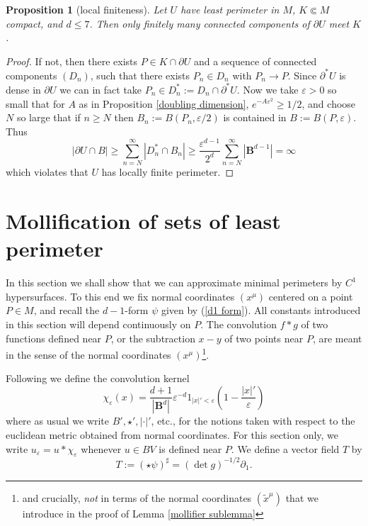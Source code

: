 \documentclass[reqno,12pt,letterpaper]{amsart}
\newcommand{\Ball}{\mathbf{B}}
\newtheorem{proposition}[theorem]{Proposition}
\theoremstyle{definition}
\numberwithin{equation}{section}
\begin{document}
\begin{proposition}[local finiteness]\label{local finiteness}
Let $U$ have least perimeter in $M$, $K \Subset M$ compact, and $d \leq 7$. Then only finitely many connected components of $\partial U$ meet $K$.
\end{proposition}
\begin{proof}
If not, then there exists $P \in K \cap \partial U$ and a sequence of connected components $(D_n)$, such that there exists $P_n \in D_n$ with $P_n \to P$.
Since $\partial^* U$ is dense in $\partial U$ we can in fact take $P_n \in D_n^* := D_n \cap \partial^* U$.
Now we take $\varepsilon > 0$ so small that for $A$ as in Proposition \ref{doubling dimension}, $e^{-A\varepsilon^2} \geq 1/2$, and choose $N$ so large that if $n \geq N$ then $B_n := B(P_n, \varepsilon/2)$ is contained in $B := B(P, \varepsilon)$.
Thus 
$$|\partial U \cap B| \geq \sum_{n=N}^\infty |D_n^* \cap B_n| \geq \frac{\varepsilon^{d - 1}}{2^d} \sum_{n=N}^\infty |\Ball^{d - 1}| = \infty$$
which violates that $U$ has locally finite perimeter.
\end{proof}

\section{Mollification of sets of least perimeter}\label{MollifierSection}
In this section we shall show that we can approximate minimal perimeters by $C^1$ hypersurfaces.
To this end we fix normal coordinates $(x^\mu)$ centered on a point $P \in M$, and recall the $d-1$-form $\psi$ given by (\ref{d1 form}).
All constants introduced in this section will depend continuously on $P$.
The convolution $f * g$ of two functions defined near $P$, or the subtraction $x - y$ of two points near $P$, are meant in the sense of the normal coordinates $(x^\mu)$\footnote{and crucially, \emph{not} in terms of the normal coordinates $(\tilde x^\mu)$ that we introduce in the proof of Lemma \ref{mollifier sublemma}}.

Following \cite[Chapter 7]{Giusti77} we define the convolution kernel
$$\chi_\varepsilon(x) = \frac{d + 1}{|\Ball^d|} \varepsilon^{-d}1_{|x|' < \varepsilon} \left(1 - \frac{|x|'}{\varepsilon}\right)$$
where as usual we write $B', \star', |\cdot|'$, etc., for the notions taken with respect to the euclidean metric obtained from normal coordinates.
For this section only, we write $u_\varepsilon = u * \chi_\varepsilon$ whenever $u \in BV$ is defined near $P$.
We define a vector field $T$ by
\begin{equation}\label{T in coords}
T := (\star \psi)^\sharp = (\det g)^{-1/2} \partial_1.
\end{equation}
\end{document}
